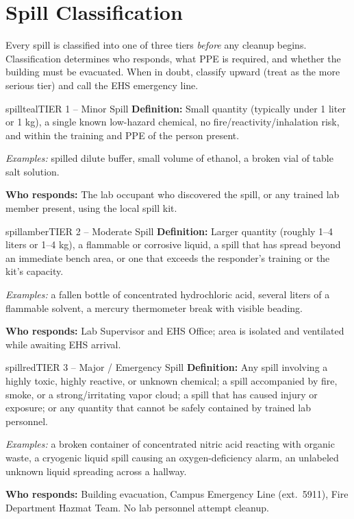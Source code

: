
\section{Spill Classification}
\label{sec:classification}

Every spill is classified into one of three tiers \emph{before} any cleanup begins. Classification
determines who responds, what PPE is required, and whether the building must be evacuated. When in
doubt, classify upward (treat as the more serious tier) and call the EHS emergency line.

\begin{tierbox}{spillteal}{TIER 1 -- Minor Spill}
\textbf{Definition:} Small quantity (typically under 1 liter or 1 kg), a single known low-hazard
chemical, no fire/reactivity/inhalation risk, and within the training and PPE of the person present.

\textit{Examples:} spilled dilute buffer, small volume of ethanol, a broken vial of table salt
solution.

\textbf{Who responds:} The lab occupant who discovered the spill, or any trained lab member
present, using the local spill kit.
\end{tierbox}

\vspace{0.35em}

\begin{tierbox}{spillamber}{TIER 2 -- Moderate Spill}
\textbf{Definition:} Larger quantity (roughly 1--4 liters or 1--4 kg), a flammable or corrosive
liquid, a spill that has spread beyond an immediate bench area, or one that exceeds the
responder's training or the kit's capacity.

\textit{Examples:} a fallen bottle of concentrated hydrochloric acid, several liters of a
flammable solvent, a mercury thermometer break with visible beading.

\textbf{Who responds:} Lab Supervisor and EHS Office; area is isolated and ventilated while
awaiting EHS arrival.
\end{tierbox}

\vspace{0.35em}

\begin{tierbox}{spillred}{TIER 3 -- Major / Emergency Spill}
\textbf{Definition:} Any spill involving a highly toxic, highly reactive, or unknown chemical;
a spill accompanied by fire, smoke, or a strong/irritating vapor cloud; a spill that has caused
injury or exposure; or any quantity that cannot be safely contained by trained lab personnel.

\textit{Examples:} a broken container of concentrated nitric acid reacting with organic waste,
a cryogenic liquid spill causing an oxygen-deficiency alarm, an unlabeled unknown liquid spreading
across a hallway.

\textbf{Who responds:} Building evacuation, Campus Emergency Line (ext.\ 5911), Fire Department
Hazmat Team. No lab personnel attempt cleanup.
\end{tierbox}
